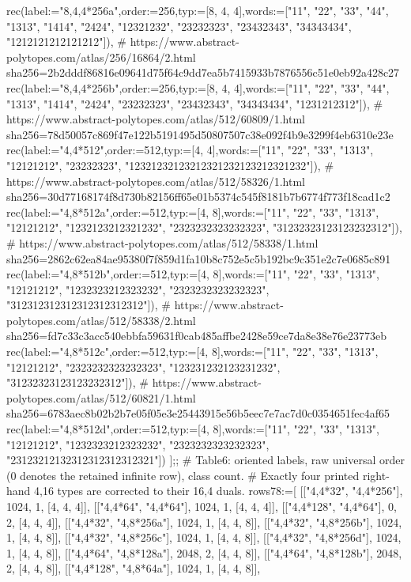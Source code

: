 \documentclass[11pt,a4paper]{article}
\begin{document}
\begin{CompleteProgram}
rec(label:="{8,4,4}*256a",order:=256,typ:=[8, 4, 4],words:=["11", "22", "33", "44", "1313", "1414", "2424", "12321232", "23232323", "23432343", "34343434", "1212121212121212"]),
# https://www.abstract-polytopes.com/atlas/256/16864/2.html sha256=2b2dddf86816e09641d75f64c9dd7ea5b7415933b7876556c51e0eb92a428c27
rec(label:="{8,4,4}*256b",order:=256,typ:=[8, 4, 4],words:=["11", "22", "33", "44", "1313", "1414", "2424", "23232323", "23432343", "34343434", "1231212312"]),
# https://www.abstract-polytopes.com/atlas/512/60809/1.html sha256=78d50057c869f47e122b5191495d50807507c38e092f4b9e3299f4eb6310e23e
rec(label:="{4,4}*512",order:=512,typ:=[4, 4],words:=["11", "22", "33", "1313", "12121212", "23232323", "12321232123212321232123212321232"]),
# https://www.abstract-polytopes.com/atlas/512/58326/1.html sha256=30d77168174f8d730b82156ff65e01b5374c545f8181b7b6774f773f18cad1c2
rec(label:="{4,8}*512a",order:=512,typ:=[4, 8],words:=["11", "22", "33", "1313", "12121212", "1232123212321232", "2323232323232323", "31232323123123232312"]),
# https://www.abstract-polytopes.com/atlas/512/58338/1.html sha256=2862c62ea84ae95380f7f859d1fa10b8c752e5c5b192bc9c351e2c7e0685c891
rec(label:="{4,8}*512b",order:=512,typ:=[4, 8],words:=["11", "22", "33", "1313", "12121212", "1232323212323232", "2323232323232323", "312312312312312312312312"]),
# https://www.abstract-polytopes.com/atlas/512/58338/2.html sha256=fd7c33c3acc540ebbfa59631f0cab485affbe2428e59ce7da8e38e76e23773eb
rec(label:="{4,8}*512c",order:=512,typ:=[4, 8],words:=["11", "22", "33", "1313", "12121212", "2323232323232323", "123231232123231232", "31232323123123232312"]),
# https://www.abstract-polytopes.com/atlas/512/60821/1.html sha256=6783aec8b02b2b7e05f05e3e25443915e56b5eec7e7ac7d0c0354651fec4af65
rec(label:="{4,8}*512d",order:=512,typ:=[4, 8],words:=["11", "22", "33", "1313", "12121212", "1232323212323232", "2323232323232323", "23123212132312312312312321"])
];;
# Table6: oriented labels, raw universal order (0 denotes the retained infinite row), class count.
# Exactly four printed right-hand {4,16} types are corrected to their {16,4} duals.
rows78:=[
[["{4,4}*32", "{4,4}*256"], 1024, 1, [4, 4, 4]],
[["{4,4}*64", "{4,4}*64"], 1024, 1, [4, 4, 4]],
[["{4,4}*128", "{4,4}*64"], 0, 2, [4, 4, 4]],
[["{4,4}*32", "{4,8}*256a"], 1024, 1, [4, 4, 8]],
[["{4,4}*32", "{4,8}*256b"], 1024, 1, [4, 4, 8]],
[["{4,4}*32", "{4,8}*256c"], 1024, 1, [4, 4, 8]],
[["{4,4}*32", "{4,8}*256d"], 1024, 1, [4, 4, 8]],
[["{4,4}*64", "{4,8}*128a"], 2048, 2, [4, 4, 8]],
[["{4,4}*64", "{4,8}*128b"], 2048, 2, [4, 4, 8]],
[["{4,4}*128", "{4,8}*64a"], 1024, 1, [4, 4, 8]],

\end{CompleteProgram}
\end{document}
